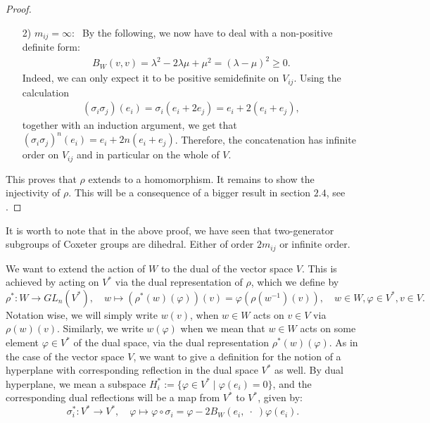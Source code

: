 \begin{proof}
\begin{itemize}
        \item[2)] \(m_{ij} = \infty:\;\) By the following, we now have to deal with a non-positive definite form:
              \begin{align*}
                  B_W(v,v) = \lambda^2 - 2\lambda\mu + \mu^2 = (\lambda - \mu)^2 \geq 0.
              \end{align*}
              Indeed, we can only expect it to be positive semidefinite on \(V_{ij}\).
              Using the calculation
              \begin{align*}
                  (\sigma_i\sigma_j)(e_i) = \sigma_i (e_i + 2e_j) = e_i + 2(e_i + e_j),
              \end{align*}
              together with an induction argument, we get that \((\sigma_i\sigma_j)^n(e_i) = e_i + 2n(e_i + e_j)\).
              Therefore, the concatenation has infinite order on \(V_{ij}\) and in particular on the whole of \(V\).
    \end{itemize}
    This proves that \(\rho\) extends to a homomorphism.
    It remains to show the injectivity of \(\rho\).
    This will be a consequence of a bigger result in section \(2.4\), see .
\end{proof}

\begin{remark}
    It is worth to note that in the above proof, we have seen that two-generator subgroups of Coxeter groups are dihedral.
    Either of order \(2m_{ij}\) or infinite order.
\end{remark}

We want to extend the action of \(W\) to the dual of the vector space \(V\).
This is achieved by acting on \(V^*\) via the dual representation of \(\rho\), which we define by
\[\rho^* : W \to GL_n(V^*),\quad w \mapsto (\rho^*(w)(\varphi))(v) = \varphi(\rho(w^{-1})(v)), \quad w\in W, \varphi\in V^*, v\in V.\]
Notation wise, we will simply write \(w(v)\), when \(w \in W\) acts on \(v \in V\) via \(\rho(w)(v)\).
Similarly, we write \(w(\varphi)\) when we mean that \(w \in W\) acts on some element \(\varphi \in V^*\) of the dual space, via the dual representation \(\rho^*(w)(\varphi)\).
As in the case of the vector space \(V\), we want to give a definition for the notion of a hyperplane with corresponding reflection in the dual space \(V^*\) as well.
By dual hyperplane, we mean a subspace \(H_i^* := \{\varphi \in V^* \;\vert\; \varphi (e_i) = 0\}\), and the corresponding dual reflections will be a map from \(V^*\) to \(V^*\), given by:
\[\sigma_i^* : V^* \to V^*,\quad \varphi \mapsto \varphi \circ \sigma_i = \varphi - 2B_W(e_i,\;\cdot\;)\varphi(e_i).\]

